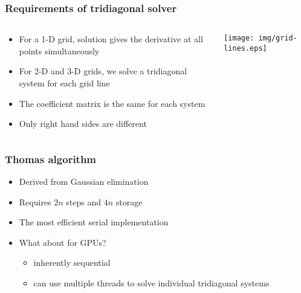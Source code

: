 \begin{frame}
\frametitle{Requirements of tridiagonal solver}
\begin{columns}
\begin{column}{0.5\textwidth}
\begin{itemize}
\item For a 1-D grid, solution gives the derivative
    at all points simultaneously
\item For 2-D and 3-D grids, we solve a tridiagonal system
    for each grid line
\item The coefficient matrix is the same for each system
\item Only right hand sides are different
\end{itemize}
\end{column}
\begin{column}{0.5\textwidth}
    \hspace{1cm}
    \texttt{[image: img/grid-lines.eps]}
\end{column}
\end{columns}
\end{frame}

\begin{frame}
\frametitle{Thomas algorithm}
\begin{itemize}
\item Derived from Gaussian elimination
\item Requires $2n$ steps and $4n$ storage
\item The most efficient serial implementation
\item What about for GPUs?
    \begin{itemize}
        \item inherently sequential
        \item can use multiple threads to solve
            individual tridiagonal systems
    \end{itemize}
\end{itemize}
\end{frame}

